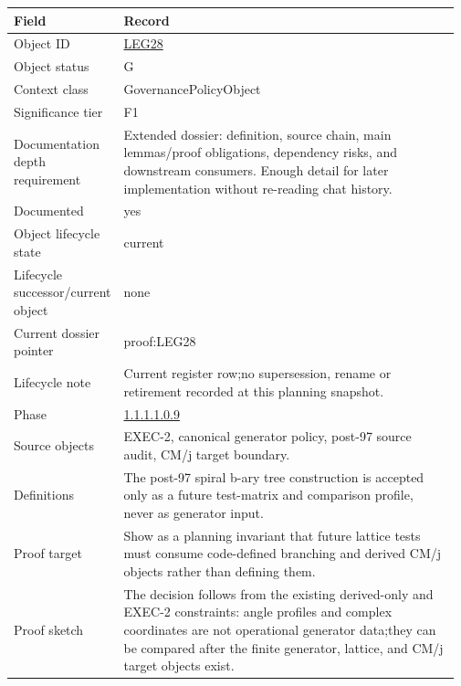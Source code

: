 \begin{longtable}{L{0.16\linewidth} L{0.81\linewidth}}
\hline
\textbf{Field} & \textbf{Record}\\
\hline
Object ID & \hyperlink{object-row-LEG28}{LEG28}\\
\hline\addlinespace[0.20em]
Object status & G\\
\hline\addlinespace[0.20em]
Context class & GovernancePolicyObject\\
\hline\addlinespace[0.20em]
Significance tier & F1\\
\hline\addlinespace[0.20em]
Documentation depth requirement & Extended dossier: definition, source chain, main lemmas/\allowbreak{}proof obligations, dependency risks, and downstream consumers. Enough detail for later implementation without re-reading chat history.\\
\hline\addlinespace[0.20em]
Documented & yes\\
\hline\addlinespace[0.20em]
Object lifecycle state & current\\
\hline\addlinespace[0.20em]
Lifecycle successor/\allowbreak{}current object & none\\
\hline\addlinespace[0.20em]
Current dossier pointer & proof:LEG28\\
\hline\addlinespace[0.20em]
Lifecycle note & Current register row;\newline no supersession, rename or retirement recorded at this planning snapshot.\\
\hline\addlinespace[0.20em]
Phase & \hyperlink{phase-row-1-1-1-1-0-9}{1.1.1.1.0.9}\\
\hline\addlinespace[0.20em]
Source objects & EXEC-2, canonical generator policy, post-97 source audit, CM/\allowbreak{}j target boundary.\\
\hline\addlinespace[0.20em]
Definitions & The post-97 spiral b-ary tree construction is accepted only as a future test-matrix and comparison profile, never as generator input.\\
\hline\addlinespace[0.20em]
Proof target & Show as a planning invariant that future lattice tests must consume code-defined branching and derived CM/\allowbreak{}j objects rather than defining them.\\
\hline\addlinespace[0.20em]
Proof sketch & The decision follows from the existing derived-only and EXEC-2 constraints: angle profiles and complex coordinates are not operational generator data;\newline they can be compared after the finite generator, lattice, and CM/\allowbreak{}j target objects exist.\\

\end{longtable}
